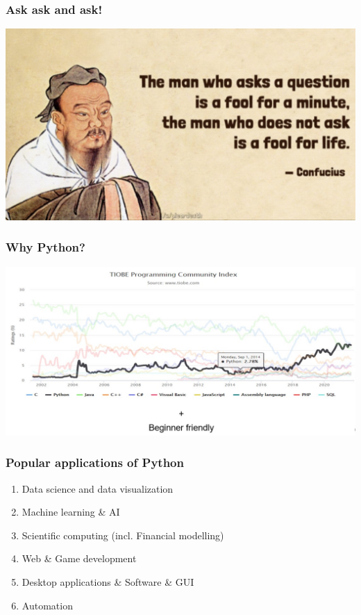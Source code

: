 \documentclass{beamer}
\begin{document}

\begin{frame}
\frametitle{Ask ask and ask!}
\centering
\includegraphics[scale = 0.5]{figures/confucius.jpg}
\end{frame}

\begin{frame}
    \frametitle{Why Python?}
    \centering
    \includegraphics[scale = 0.5]{figures/trend_python.jpg}
\end{frame}

\begin{frame}
    \frametitle{Popular applications of Python}
    \begin{enumerate}
        \item Data science and data visualization
        \item Machine learning \& AI
        \item Scientific computing (incl. Financial modelling)
        \item Web \& Game development
        \item Desktop applications \& Software \& GUI
        \item Automation
    \end{enumerate}
\end{frame}
\end{document}
